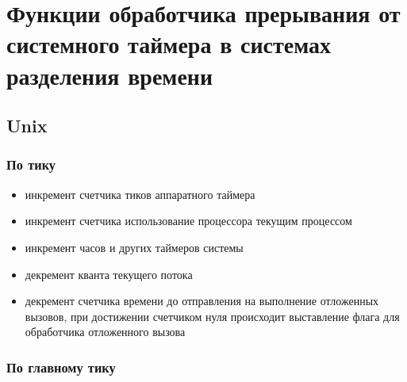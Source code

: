 \setcounter{page}{2}
\chapter{Функции обработчика прерывания от системного таймера в системах разделения времени}


\section{Unix} %
\subsection*{По тику}

\begin{itemize}
	\item инкремент счетчика тиков аппаратного таймера
	\item инкремент счетчика использование процессора текущим процессом %
	\item инкремент часов и других таймеров системы
	\item декремент кванта текущего потока
	\item декремент счетчика времени до отправления на выполнение отложенных вызовов, при достижении счетчиком нуля происходит выставление флага для обработчика отложенного вызова \cite{unix}
\end{itemize}

\subsection*{По главному тику}

